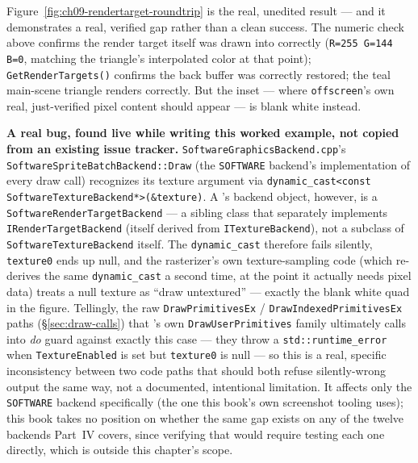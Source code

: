 Figure~\ref{fig:ch09-rendertarget-roundtrip} is the real, unedited result --- and it demonstrates
a real, verified gap rather than a clean success. The numeric check above confirms the render
target itself was drawn into correctly (\texttt{R=255 G=144 B=0}, matching the triangle's
interpolated color at that point); \texttt{GetRenderTargets()} confirms the back buffer was
correctly restored; the teal main-scene triangle renders correctly. But the inset --- where
\texttt{offscreen}'s own real, just-verified pixel content should appear --- is blank white
instead.

\begin{sourcenote}
\textbf{A real bug, found live while writing this worked example, not copied from an existing
issue tracker.} \texttt{SoftwareGraphicsBackend.cpp}'s \texttt{SoftwareSpriteBatchBackend::Draw}
(the \texttt{SOFTWARE} backend's implementation of every  draw call)
recognizes its texture argument via \texttt{dynamic\_cast<const SoftwareTextureBackend*>(\&texture)}.
A 's backend object, however, is a \texttt{SoftwareRenderTargetBackend}
--- a sibling class that separately implements \texttt{IRenderTargetBackend} (itself derived
from \texttt{ITextureBackend}), not a subclass of \texttt{SoftwareTextureBackend} itself. The
\texttt{dynamic\_cast} therefore fails silently, \texttt{texture0} ends up null, and the
rasterizer's own texture-sampling code (which re-derives the same \texttt{dynamic\_cast} a
second time, at the point it actually needs pixel data) treats a null texture as ``draw
untextured'' --- exactly the blank white quad in the figure. Tellingly, the raw
\texttt{DrawPrimitivesEx} / \texttt{DrawIndexedPrimitivesEx} paths (\S\ref{sec:draw-calls}) that
's own \texttt{DrawUserPrimitives} family ultimately calls into
\emph{do} guard against exactly this case --- they throw a \texttt{std::runtime\_error} when
\texttt{TextureEnabled} is set but \texttt{texture0} is null --- so this is a real, specific
inconsistency between two code paths that should both refuse silently-wrong output the same
way, not a documented, intentional limitation. It affects only the \texttt{SOFTWARE} backend
specifically (the one this book's own screenshot tooling uses); this book takes no position on
whether the same gap exists on any of the twelve backends Part~IV covers, since verifying that
would require testing each one directly, which is outside this chapter's scope.
\end{sourcenote}

